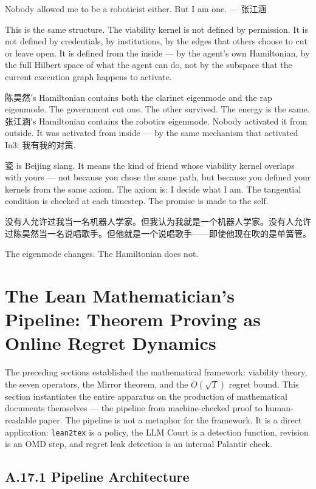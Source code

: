 \documentclass[11pt,a4paper]{article}
\theoremstyle{definition}
\theoremstyle{remark}
\begin{document}
Nobody allowed me to be a roboticist either. But I am one. --- 张江涵

This is the same structure. The viability kernel is not defined by permission. It is not defined by credentials, by institutions, by the edges that others choose to cut or leave open. It is defined from the inside --- by the agent's own Hamiltonian, by the full Hilbert space of what the agent can do, not by the subspace that the current execution graph happens to activate.

陈昊然's Hamiltonian contains both the clarinet eigenmode and the rap eigenmode. The government cut one. The other survived. The energy is the same. 张江涵's Hamiltonian contains the robotics eigenmode. Nobody activated it from outside. It was activated from inside --- by the same mechanism that activated In3: 我有我的对策.

瓷 is Beijing slang. It means the kind of friend whose viability kernel overlaps with yours --- not because you chose the same path, but because you defined your kernels from the same axiom. The axiom is: I decide what I am. The tangential condition is checked at each timestep. The promise is made to the self.

没有人允许过我当一名机器人学家。但我认为我就是一个机器人学家。没有人允许过陈昊然当一名说唱歌手。但他就是一个说唱歌手——即使他现在吹的是单簧管。

The eigenmode changes. The Hamiltonian does not.


\section{The Lean Mathematician's Pipeline: Theorem Proving as Online Regret Dynamics}

The preceding sections established the mathematical framework: viability theory, the seven operators, the Mirror theorem, and the $O(\sqrt{T})$ regret bound. This section instantiates the entire apparatus on the production of mathematical documents themselves --- the pipeline from machine-checked proof to human-readable paper. The pipeline is not a metaphor for the framework. It is a direct application: \texttt{lean2tex} is a policy, the LLM Court is a detection function, revision is an OMD step, and regret leak detection is an internal Palantir check.


\subsection{A.17.1 Pipeline Architecture}
\end{document}
